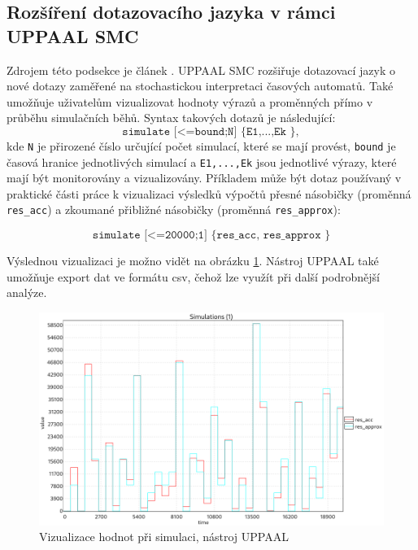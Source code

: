 \subsection{Rozšíření dotazovacího jazyka v rámci UPPAAL SMC} \label{uppaal_smc_queries}
Zdrojem této podsekce je článek \cite{uppaal_smc}. UPPAAL SMC rozšiřuje dotazovací jazyk o nové dotazy zaměřené na stochastickou interpretaci časových automatů. Také umožňuje uživatelům vizualizovat hodnoty výrazů a proměnných přímo v průběhu simulačních běhů. Syntax takových dotazů je následující:
\begin{equation*}
    \texttt{simulate [<=bound;N] \{ E1,...,Ek \}},
\end{equation*}
kde \texttt{N} je přirozené číslo určující počet simulací, které se mají provést, \texttt{bound} je časová hranice jednotlivých simulací a \texttt{E1,...,Ek} jsou jednotlivé výrazy, které mají být monitorovány a vizualizovány. Příkladem může být dotaz používaný v praktické části práce k vizualizaci výsledků výpočtů přesné násobičky (proměnná \texttt{res\_acc}) a zkoumané přibližné násobičky (proměnná \texttt{res\_approx}):

\begin{equation*}
    \texttt{simulate [<=20000;1] \{ res\_acc, res\_approx \}}
\end{equation*}

Výslednou vizualizaci je možno vidět na obrázku \ref{fig:simulate_example}. Nástroj UPPAAL také umožňuje export dat ve formátu csv, čehož lze využít při další podrobnější analýze.

\begin{figure}[H]
    \centering
    \includegraphics[width=\textwidth]{obrazky-figures/simulate_example.png}
    \caption{Vizualizace hodnot při simulaci, nástroj UPPAAL}
    \label{fig:simulate_example}
\end{figure}

